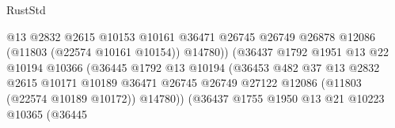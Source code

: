 \begin{lexlean}{RustStd}
\begin{coremodule}
                                                  @13
                                                  @2832
                                                  @2615
                                                  @10153
                                                  @10161
                                                  @36471
                                                  @26745
                                                  @26749
                                                  @26878
                                                  @12086
                                                  (@11803 (@22574 @10161 @10154))
                                                  @14780))
                                              (@36437
                                                @1792
                                                @1951
                                                @13
                                                @22
                                                @10194
                                                @10366
                                                (@36445
                                                  @1792
                                                  @13
                                                  @10194
                                                  (@36453
                                                    @482
                                                    @37
                                                    @13
                                                    @2832
                                                    @2615
                                                    @10171
                                                    @10189
                                                    @36471
                                                    @26745
                                                    @26749
                                                    @27122
                                                    @12086
                                                    (@11803 (@22574 @10189 @10172))
                                                    @14780))
                                                (@36437
                                                  @1755
                                                  @1950
                                                  @13
                                                  @21
                                                  @10223
                                                  @10365
                                                  (@36445

\end{coremodule}
\end{lexlean}
